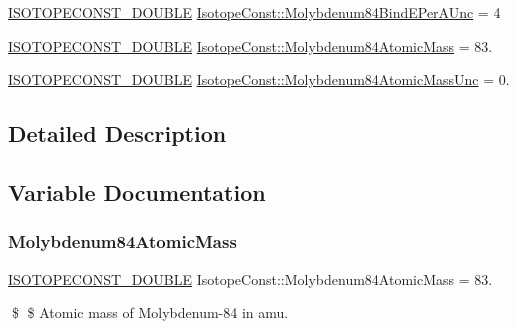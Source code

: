 \begin{DoxyCompactItemize}
\mbox{\hyperlink{group___isotope_const-_macros_ga8f45a7272ce02c0b4c65c44636ed719a}{I\+S\+O\+T\+O\+P\+E\+C\+O\+N\+S\+T\+\_\+\+D\+O\+U\+B\+LE}} \mbox{\hyperlink{group___isotope_const-_molybdenum-_mo84_ga0a8cef9c00dc6f54f9d7a2a184d26319}{Isotope\+Const\+::\+Molybdenum84\+Bind\+E\+Per\+A\+Unc}} = 4
\item 
\mbox{\hyperlink{group___isotope_const-_macros_ga8f45a7272ce02c0b4c65c44636ed719a}{I\+S\+O\+T\+O\+P\+E\+C\+O\+N\+S\+T\+\_\+\+D\+O\+U\+B\+LE}} \mbox{\hyperlink{group___isotope_const-_molybdenum-_mo84_ga3cb462dab9a5958f4507af24a1f64d57}{Isotope\+Const\+::\+Molybdenum84\+Atomic\+Mass}} = 83.
\item 
\mbox{\hyperlink{group___isotope_const-_macros_ga8f45a7272ce02c0b4c65c44636ed719a}{I\+S\+O\+T\+O\+P\+E\+C\+O\+N\+S\+T\+\_\+\+D\+O\+U\+B\+LE}} \mbox{\hyperlink{group___isotope_const-_molybdenum-_mo84_ga1d33e97791cd61bb9cceb3d052ae9114}{Isotope\+Const\+::\+Molybdenum84\+Atomic\+Mass\+Unc}} = 0.
\end{DoxyCompactItemize}


\subsection{Detailed Description}


\subsection{Variable Documentation}
\mbox{\label{group___isotope_const-_molybdenum-_mo84_ga3cb462dab9a5958f4507af24a1f64d57}} 
\subsubsection{\texorpdfstring{Molybdenum84\+Atomic\+Mass}{Molybdenum84AtomicMass}}
{\footnotesize\ttfamily \mbox{\hyperlink{group___isotope_const-_macros_ga8f45a7272ce02c0b4c65c44636ed719a}{I\+S\+O\+T\+O\+P\+E\+C\+O\+N\+S\+T\+\_\+\+D\+O\+U\+B\+LE}} Isotope\+Const\+::\+Molybdenum84\+Atomic\+Mass = 83.}

\$ \$ Atomic mass of Molybdenum-\/84 in amu. \mbox{\label{group___isotope_const-_molybdenum-_mo84_ga1d33e97791cd61bb9cceb3d052ae9114}} 
